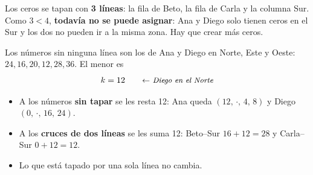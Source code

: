 \documentclass[11pt,a4paper]{article}
\let\pasobase\paso
\renewcommand{\paso}[1]{\needspace{7\baselineskip}\pasobase{#1}}
\newcommand{\rejilla}[3]{%
  \foreach \i in {2,...,#2}{\foreach \j in {2,...,#3}{%
    \draw[gray!55, thin] (#1-\i-\j.north west) rectangle (#1-\i-\j.south east);}}%
  \draw[thick] (#1-2-2.north west) rectangle (#1-#2-#3.south east);}
\newcommand{\lfila}[3]{\begin{pgfonlayer}{background}\draw[tapa] ($(#1-#2-2.west)+(-1.5pt,0)$) -- ($(#1-#2-#3.east)+(1.5pt,0)$);\end{pgfonlayer}}
\newcommand{\lcol}[3]{\begin{pgfonlayer}{background}\draw[tapa] ($(#1-2-#2.north)+(0,1.5pt)$) -- ($(#1-#3-#2.south)+(0,-1.5pt)$);\end{pgfonlayer}}
\newcommand{\pie}[4]{\node[font=\footnotesize, below=1mm, align=center] at ($(#1-#2-2.south west)!0.5!(#1-#2-#3.south east)$) {#4};}
\begin{document}
\begin{minipage}[c]{0.45\textwidth}
\centering
{}
\end{minipage}\hfill
\begin{minipage}[c]{0.52\textwidth}
Los ceros se tapan con \textbf{3 líneas}: la fila de Beto, la fila de Carla y la columna Sur.
Como $3 < 4$, \textbf{todavía no se puede asignar}: Ana y Diego solo tienen ceros en el Sur y los dos no pueden
ir a la misma zona. Hay que crear más ceros.
\end{minipage}

Los números sin ninguna línea son los de Ana y Diego en Norte, Este y Oeste: $24, 16, 20, 12, 28, 36$.
El menor es
\[
k = 12 \nota{Diego en el Norte}
\]
\begin{itemize}[itemsep=2pt]
  \item A los números \textbf{sin tapar} se les resta 12: Ana queda $(12,\,\cdot,\,4,\,8)$ y Diego $(0,\,\cdot,\,16,\,24)$.
  \item A los \textbf{cruces de dos líneas} se les suma 12: Beto--Sur $16 + 12 = 28$ y Carla--Sur $0 + 12 = 12$.
  \item Lo que está tapado por una sola línea no cambia.
\end{itemize}
\end{document}
